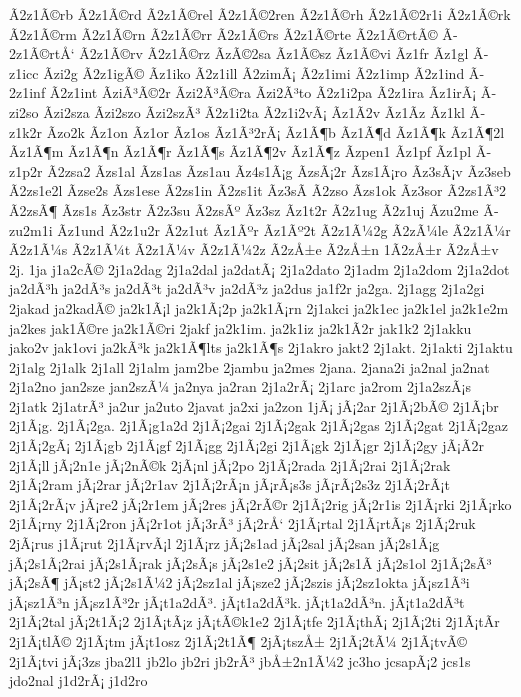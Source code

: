 {Ã­2z1Ã©rb
Ã­2z1Ã©rd
Ã­2z1Ã©rel
Ã­2z1Ã©2ren
Ã­2z1Ã©rh
Ã­2z1Ã©2r1i
Ã­2z1Ã©rk
Ã­2z1Ã©rm
Ã­2z1Ã©rn
Ã­2z1Ã©rr
Ã­2z1Ã©rs
Ã­2z1Ã©rte
Ã­2z1Ã©rtÃ©
Ã­2z1Ã©rtÅ‘
Ã­2z1Ã©rv
Ã­2z1Ã©rz
Ã­zÃ©2sa
Ã­z1Ã©sz
Ã­z1Ã©vi
Ã­z1fr
Ã­z1gl
Ã­z1icc
Ã­zi2g
Ã­2z1igÃ©
Ã­z1iko
Ã­2z1ill
Ã­2zimÃ¡
Ã­2z1imi
Ã­2z1imp
Ã­2z1ind
Ã­2z1inf
Ã­2z1int
Ã­ziÃ³Ã©2r
Ã­zi2Ã³Ã©ra
Ã­zi2Ã³to
Ã­2z1i2pa
Ã­2z1ira
Ã­z1irÃ¡
Ã­zi2so
Ã­zi2sza
Ã­zi2szo
Ã­zi2szÃ³
Ã­2z1i2ta
Ã­2z1i2vÃ¡
Ã­z1Ã­2v
Ã­z1Ã­z
Ã­z1kl
Ã­z1k2r
Ã­zo2k
Ã­z1on
Ã­z1or
Ã­z1os
Ã­z1Ã³2rÃ¡
Ã­z1Ã¶b
Ã­z1Ã¶d
Ã­z1Ã¶k
Ã­z1Ã¶2l
Ã­z1Ã¶m
Ã­z1Ã¶n
Ã­z1Ã¶r
Ã­z1Ã¶s
Ã­z1Ã¶2v
Ã­z1Ã¶z
Ã­zpen1
Ã­z1pf
Ã­z1pl
Ã­z1p2r
Ã­2zsa2
Ã­zs1al
Ã­zs1as
Ã­zs1au
Ã­z4s1Ã¡g
Ã­zsÃ¡2r
Ã­zs1Ã¡ro
Ã­z3sÃ¡v
Ã­z3seb
Ã­2zs1e2l
Ã­zse2s
Ã­zs1ese
Ã­2zs1in
Ã­2zs1it
Ã­z3sÃ­
Ã­2zso
Ã­zs1ok
Ã­z3sor
Ã­2zs1Ã³2
Ã­2zsÃ¶
Ã­zs1s
Ã­z3str
Ã­2z3su
Ã­2zsÃº
Ã­z3sz
Ã­z1t2r
Ã­2z1ug
Ã­2z1uj
Ã­zu2me
Ã­zu2m1i
Ã­z1und
Ã­2z1u2r
Ã­2z1ut
Ã­z1Ãºr
Ã­z1Ãº2t
Ã­2z1Ã¼2g
Ã­2zÃ¼le
Ã­2z1Ã¼r
Ã­2z1Ã¼s
Ã­2z1Ã¼t
Ã­2z1Ã¼v
Ã­2z1Ã¼2z
Ã­2zÅ±e
Ã­2zÅ±n
1Ã­2zÅ±r
Ã­2zÅ±v
2j.
1ja
j1a2cÃ©
2j1a2dag
2j1a2dal
ja2datÃ¡
2j1a2dato
2j1adm
2j1a2dom
2j1a2dot
ja2dÃ³h
ja2dÃ³s
ja2dÃ³t
ja2dÃ³v
ja2dÃ³z
ja2dus
ja1f2r
ja2ga.
2j1agg
2j1a2gi
2jakad
ja2kadÃ©
ja2k1Ã¡l
ja2k1Ã¡2p
ja2k1Ã¡rn
2j1akci
ja2k1ec
ja2k1el
ja2k1e2m
ja2kes
jak1Ã©re
ja2k1Ã©ri
2jakf
ja2k1im.
ja2k1iz
ja2k1Ã­2r
jak1k2
2j1akku
jako2v
jak1ovi
ja2kÃ³k
ja2k1Ã¶lts
ja2k1Ã¶s
2j1akro
jakt2
2j1akt.
2j1akti
2j1aktu
2j1alg
2j1alk
2j1all
2j1alm
jam2be
2jambu
ja2mes
2jana.
2jana2i
ja2nal
ja2nat
2j1a2no
jan2sze
jan2szÃ¼
ja2nya
ja2ran
2j1a2rÃ¡
2j1arc
ja2rom
2j1a2szÃ¡s
2j1atk
2j1atrÃ³
ja2ur
ja2uto
2javat
ja2xi
ja2zon
1jÃ¡
jÃ¡2ar
2j1Ã¡2bÃ©
2j1Ã¡br
2j1Ã¡g.
2j1Ã¡2ga.
2j1Ã¡g1a2d
2j1Ã¡2gai
2j1Ã¡2gak
2j1Ã¡2gas
2j1Ã¡2gat
2j1Ã¡2gaz
2j1Ã¡2gÃ¡
2j1Ã¡gb
2j1Ã¡gf
2j1Ã¡gg
2j1Ã¡2gi
2j1Ã¡gk
2j1Ã¡gr
2j1Ã¡2gy
jÃ¡Ã­2r
2j1Ã¡ll
jÃ¡2n1e
jÃ¡2nÃ©k
2jÃ¡nl
jÃ¡2po
2j1Ã¡2rada
2j1Ã¡2rai
2j1Ã¡2rak
2j1Ã¡2ram
jÃ¡2rar
jÃ¡2r1av
2j1Ã¡2rÃ¡n
jÃ¡rÃ¡s3s
jÃ¡rÃ¡2s3z
2j1Ã¡2rÃ¡t
2j1Ã¡2rÃ¡v
jÃ¡re2
jÃ¡2r1em
jÃ¡2res
jÃ¡2rÃ©r
2j1Ã¡2rig
jÃ¡2r1is
2j1Ã¡rki
2j1Ã¡rko
2j1Ã¡rny
2j1Ã¡2ron
jÃ¡2r1ot
jÃ¡3rÃ³
jÃ¡2rÅ‘
2j1Ã¡rtal
2j1Ã¡rtÃ¡s
2j1Ã¡2ruk
2jÃ¡rus
j1Ã¡rut
2j1Ã¡rvÃ¡l
2j1Ã¡rz
jÃ¡2s1ad
jÃ¡2sal
jÃ¡2san
jÃ¡2s1Ã¡g
jÃ¡2s1Ã¡2rai
jÃ¡2s1Ã¡rak
jÃ¡2sÃ¡s
jÃ¡2s1e2
jÃ¡2sit
jÃ¡2s1Ã­
jÃ¡2s1ol
2j1Ã¡2sÃ³
jÃ¡2sÃ¶
jÃ¡st2
jÃ¡2s1Ã¼2
jÃ¡2sz1al
jÃ¡sze2
jÃ¡2szis
jÃ¡2sz1okta
jÃ¡sz1Ã³i
jÃ¡sz1Ã³n
jÃ¡sz1Ã³2r
jÃ¡t1a2dÃ³.
jÃ¡t1a2dÃ³k.
jÃ¡t1a2dÃ³n.
jÃ¡t1a2dÃ³t
2j1Ã¡2tal
jÃ¡2t1Ã¡2
2j1Ã¡tÃ¡z
jÃ¡tÃ©k1e2
2j1Ã¡tfe
2j1Ã¡thÃ¡
2j1Ã¡2ti
2j1Ã¡tÃ­r
2j1Ã¡tlÃ©
2j1Ã¡tm
jÃ¡t1osz
2j1Ã¡2t1Ã¶
2jÃ¡tszÅ±
2j1Ã¡2tÃ¼
2j1Ã¡tvÃ©
2j1Ã¡tvi
jÃ¡3zs
jba2l1
jb2lo
jb2ri
jb2rÃ³
jbÅ±2n1Ã¼2
jc3ho
jcsapÃ¡2
jcs1s
jdo2nal
j1d2rÃ¡
j1d2ro
}
